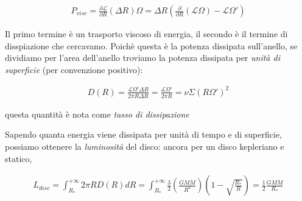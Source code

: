 \documentclass{report}
\begin{document}
\begin{align}
    P_{visc} = \frac{\partial \mathcal{L}}{\partial R}(\Delta R)\Omega = \Delta R \left(\frac{\partial}{\partial R} (\mathcal{L}\Omega) - \mathcal{L}\Omega'\right)
\end{align}

Il primo termine è un trasporto viscoso di energia, il secondo è il termine di disspiazione che cercavamo. Poichè questa è la potenza dissipata sull'anello, se dividiamo per l'area dell'anello troviamo la potenza dissipata per \emph{unità di superficie} (per convenzione positivo): 

\begin{align}
    D(R) = \frac{\mathcal{L}\Omega' \Delta R}{2\pi R \Delta R} = \frac{\mathcal{L}\Omega'}{2\pi R} = \nu\Sigma (R\Omega')^2
\end{align}

questa quantità è nota come \emph{tasso di dissipazione}



Sapendo quanta energia viene dissipata per unità di tempo e di superficie, possiamo ottenere la \emph{luminosità} del disco: ancora per un disco kepleriano e statico, 

\begin{align}
    L_{disc} = \int_{R_*}^{+\infty}2\pi R D(R) dR = \int_{R_*}^{+\infty}\frac{3}{2}\left(\frac{GM\dot{M}}{R^2}\right)\left(1 - \sqrt{\frac{R_*}{R}} \right) = \frac{1}{2}\frac{GM\dot{M}}{R_*}
\end{align}
\end{document}
